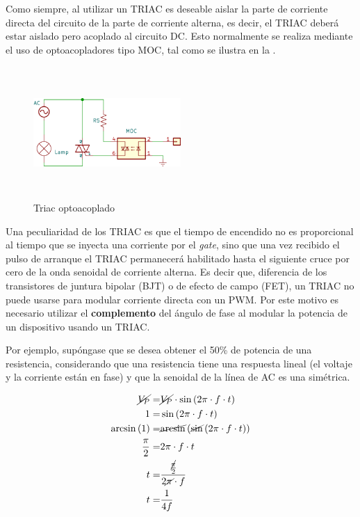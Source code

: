 Como siempre, al utilizar un TRIAC es deseable aislar la parte de corriente directa del circuito de la parte de corriente alterna, es decir, el TRIAC deberá estar aislado pero acoplado al circuito DC.
Esto normalmente se realiza mediante el uso de optoacopladores tipo MOC, tal como se ilustra en la .

\begin{figure}[H]
	\centering
	\includegraphics[width=0.5\textwidth,height=5cm,keepaspectratio]{img/triac-circuit.png}
	\caption{Triac optoacoplado}
	\label{fig:triac-circuit} %
\end{figure}

Una peculiaridad de los TRIAC es que el tiempo de encendido no es proporcional al tiempo que se inyecta una corriente por el \emph{gate}, sino que una vez recibido el pulso de arranque el TRIAC permanecerá habilitado hasta el siguiente cruce por cero de la onda senoidal de corriente alterna.
Es decir que, diferencia de los transistores de juntura bipolar (BJT) o de efecto de campo (FET), un TRIAC no puede usarse para modular corriente directa con un PWM.
Por este motivo es necesario utilizar el \textbf{complemento} del ángulo de fase al modular la potencia de un dispositivo usando un TRIAC.

Por ejemplo, supóngase que se desea obtener el 50\% de potencia\footnotemark{} de una resistencia,
considerando que una resistencia tiene una respuesta lineal (el voltaje y la corriente están en fase) y que la senoidal de la línea de AC es una simétrica.

\begin{align*}
	\cancel{V_{P}} = &
	\cancel{V_{P}} \cdot \sin\left(2\pi \cdot f \cdot t\right) \\%
	1 = &
	\sin\left(2\pi \cdot f \cdot t\right) \\%
	\arcsin\left(1\right) = &
	\cancel{\arcsin}\left(\cancel{\sin}\left(2\pi \cdot f \cdot t\right)\right) \\%
	\frac{\pi}{2} = &
	2\pi \cdot f \cdot t\\%
	t = &
	\frac{\frac{\cancel{\pi}}{2}}{2\cancel{\pi} \cdot f} \\%
	t =& \frac{1}{4f}
\end{align*}

